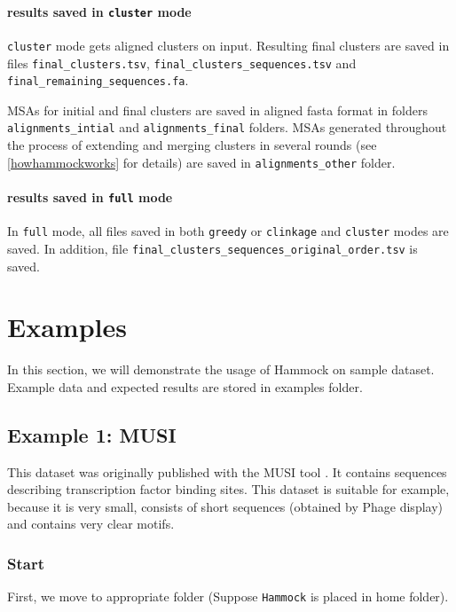 \documentclass[11pt, a4paper, twoside, titlepage]{article}
\begin{document}
\paragraph{results saved in \texttt{cluster} mode} \texttt{cluster} mode gets aligned clusters on input.
 Resulting final clusters are saved in files \texttt{final\_clusters.tsv}, \texttt{final\_clusters\_sequences.tsv} and \texttt{final\_remaining\_sequences.fa}.
 
\begin{sloppypar}
 MSAs for initial and final clusters are saved in aligned fasta format in folders \texttt{alignments\_intial} and \texttt{alignments\_final} folders. MSAs generated throughout the process of extending and merging clusters in several rounds (see \ref{howhammockworks} for details) are saved in \texttt{alignments\_other} folder. 
\end{sloppypar}
 
\paragraph{results saved in \texttt{full} mode} In \texttt{full} mode, all files saved in both \texttt{greedy} or \texttt{clinkage} and \texttt{cluster} modes are saved. In addition, file \texttt{final\_clusters\_sequences\_original\_order.tsv} is saved.

\section{Examples}
In this section, we will demonstrate the usage of Hammock on sample dataset. Example data and expected results are stored in examples folder.

\subsection{Example 1: MUSI}
This dataset was originally published with the MUSI tool \cite{Kim2011}. It contains sequences describing transcription factor binding sites. This dataset is suitable for example, because it is very small, consists of short sequences (obtained by Phage display) and contains very clear motifs. 

\subsubsection{Start}
First, we move to appropriate folder (Suppose \texttt{Hammock} is placed in home folder).\newline
\end{document}
